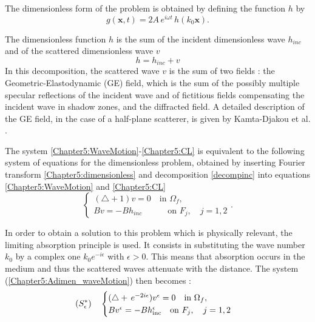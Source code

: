 The dimensionless form of the problem is obtained  by defining the function $h$ by
\begin{equation}
\label{Chapter5:dimensionless}
g(\mathbf{x},t) = 2A \, e^{i \omega t} \, h(k_0 \mathbf{x}).  
\end{equation}

The dimensionless function $h$ is the sum of the  incident dimensionless  wave $h_{inc}$ and of the scattered dimensionless  wave $v$
\begin{equation}
h = h_{inc} + v
\label{decompinc}
\end{equation}
In this decomposition, the scattered wave $v$ is the sum of two fields : the Geometric-Elastodynamic (GE) field, which  is the sum of the possibly multiple specular reflections of the incident wave and of fictitious fields compensating the incident wave in shadow zones, and the diffracted field. A detailed description of the GE field, in the case of a half-plane scatterer, is given by Kamta-Djakou et al. \cite{Audrey}.

The system \eqref{Chapter5:WaveMotion}-\eqref{Chapter5:CL} is equivalent to the following  system of equations for the dimensionless problem, obtained by inserting Fourier transform \eqref{Chapter5:dimensionless} and decomposition \eqref{decompinc} into equations \eqref{Chapter5:WaveMotion} and \eqref{Chapter5:CL}
\begin{equation}
\label{Chapter5:Adimen_waveMotion}
\begin{cases}
(\triangle+1)v =  0 \quad \text{in } \Omega_f, \\
Bv =  -Bh_{inc} \quad \quad \quad \text{on } F_j, \quad j=1,2
\end{cases}.
\end{equation}

In order to obtain a solution to this problem which is physically relevant, the limiting absorption principle is used. It consists in substituting the wave number $k_0$ by a complex one $k_0 e^{-i\epsilon} $ with $\epsilon > 0$. This means that absorption occurs in the medium and thus the scattered waves attenuate with the distance. The system (\ref{Chapter5:Adimen_waveMotion}) then becomes :
\begin{equation}
\label{Chapter5:waveMotion_epsilon}
(S_\epsilon^*) \quad
\begin{cases}
(\triangle+ \, e^{-2i\epsilon}) v^\epsilon  =  0 \quad \text{in } \Omega_f, \\
Bv^\epsilon  =  -Bh_{\rm inc}^\epsilon  \quad \text{on } F_j, \quad j=1,2
\end{cases}
\end{equation}

